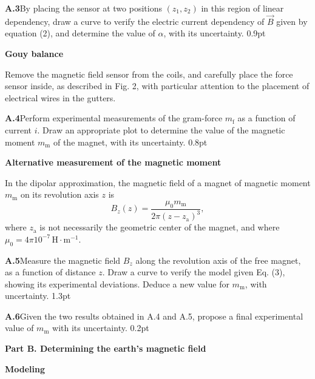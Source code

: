 \textbf{A.3}\quad By placing the sensor at two positions $(z_1, z_2)$ in this
region of linear dependency, draw a curve to verify the electric current
dependency of $\overrightarrow{B}$ given by equation (2), and determine the
value of $\alpha$, with its uncertainty. \hfill 0.9pt

\textbf{Gouy balance}

Remove the magnetic field sensor from the coils, and carefully place the force
sensor inside, as described in Fig. 2, with particular attention to the
placement of electrical wires in the gutters.

\textbf{A.4}\quad Perform experimental measurements of the gram-force
$m_\mathrm{f}$ as a function of current $i$. Draw an appropriate plot to
determine the value of the magnetic moment $m_\mathrm{m}$ of the magnet, with
its uncertainty. \hfill 0.8pt

\textbf{Alternative measurement of the magnetic moment}

In the dipolar approximation, the magnetic field of a magnet of magnetic moment
$m_\mathrm{m}$ on its revolution axis $z$ is
\begin{equation}
B_z(z) = \frac{\mu_0 m_\mathrm{m}}{2\pi(z - z_\mathrm{a})^3}, \tag{3}
\end{equation}
where $z_\mathrm{a}$ is not necessarily the geometric center of the magnet, and
where $\mu_0 = 4\pi 10^{-7}\,\mathrm{H\cdot m^{-1}}$.

\textbf{A.5}\quad Measure the magnetic field $B_z$ along the revolution axis of
the free magnet, as a function of distance $z$. Draw a curve to verify the
model given Eq. (3), showing its experimental deviations. Deduce a new value for
$m_\mathrm{m}$, with uncertainty. \hfill 1.3pt

\textbf{A.6}\quad Given the two results obtained in A.4 and A.5, propose a final
experimental value of $m_\mathrm{m}$ with its uncertainty. \hfill 0.2pt

\textbf{Part B. Determining the earth's magnetic field}

\textbf{Modeling}

